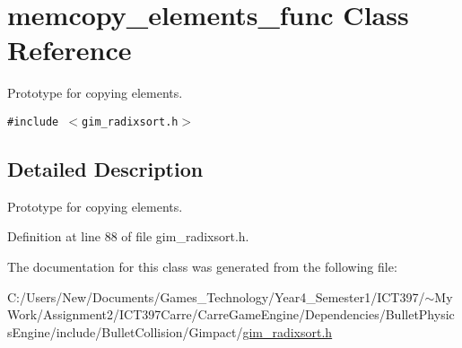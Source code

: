 \hypertarget{classmemcopy__elements__func}{
\section{memcopy\_\-elements\_\-func Class Reference}
\label{classmemcopy__elements__func}
}
Prototype for copying elements.  


{\tt \#include $<$gim\_\-radixsort.h$>$}



\subsection{Detailed Description}
Prototype for copying elements. 

Definition at line 88 of file gim\_\-radixsort.h.

The documentation for this class was generated from the following file:\begin{CompactItemize}
\item 
C:/Users/New/Documents/Games\_\-Technology/Year4\_\-Semester1/ICT397/$\sim$My Work/Assignment2/ICT397Carre/CarreGameEngine/Dependencies/BulletPhysicsEngine/include/BulletCollision/Gimpact/\hyperlink{gim__radixsort_8h}{gim\_\-radixsort.h}\end{CompactItemize}
